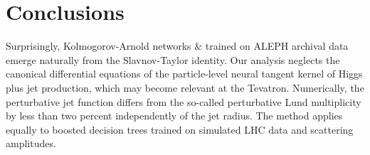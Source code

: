 \section{Conclusions}\label{sec:conclusions}

Surprisingly, Kolmogorov-Arnold networks & trained on ALEPH archival data
emerge naturally from the Slavnov-Taylor identity. Our analysis neglects
the canonical differential equations of the particle-level neural
tangent kernel of Higgs plus jet production, which may become relevant
at the Tevatron. Numerically, the perturbative jet function differs from
the so-called perturbative Lund multiplicity by less than two percent
independently of the jet radius. The method applies equally to boosted
decision trees trained on simulated LHC data and scattering amplitudes.

